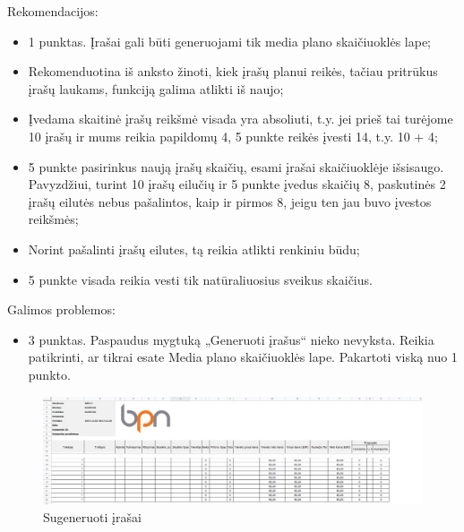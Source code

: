 \bigskip
Rekomendacijos:
\begin{itemize}
    \itemsep0em 
    \item 1 punktas. Įrašai gali būti generuojami tik media plano skaičiuoklės lape;
    \item Rekomenduotina iš anksto žinoti, kiek įrašų planui reikės, tačiau pritrūkus įrašų laukams, funkciją galima atlikti iš naujo;
    \item Įvedama skaitinė įrašų reikšmė visada yra absoliuti, t.y. jei prieš tai turėjome 10 įrašų ir mums reikia papildomų 4, 5 punkte reikės įvesti 14, t.y. 10 + 4;
    \item 5 punkte pasirinkus naują įrašų skaičių, esami įrašai skaičiuoklėje išsisaugo. Pavyzdžiui, turint 10 įrašų eilučių ir 5 punkte įvedus skaičių 8, paskutinės 2 įrašų eilutės nebus pašalintos, kaip ir pirmos 8, jeigu ten jau buvo įvestos reikšmės;
    \item Norint pašalinti įrašų eilutes, tą reikia atlikti renkiniu būdu;
    \item 5 punkte visada reikia vesti tik natūraliuosius sveikus skaičius.
\end{itemize}

\bigskip
Galimos problemos:
\begin{itemize}
    \itemsep0em 
    \item 3 punktas. Paspaudus mygtuką „Generuoti įrašus“ nieko nevyksta. Reikia patikrinti, ar tikrai esate Media plano skaičiuoklės lape. Pakartoti viską nuo 1 punkto.
\end{itemize}

\begin{figure}[H]
    \centering
    \includegraphics[scale=0.35]{Images/Screenshots/generated-records.PNG}
    \caption{Sugeneruoti įrašai}
    \label{img:model}
\end{figure}

